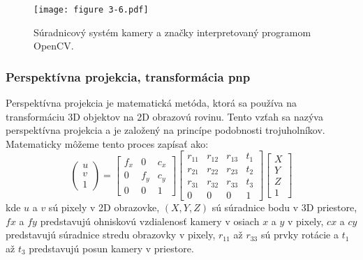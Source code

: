 {\begin{figure}[ht!]
    \centering
    \texttt{[image: figure 3-6.pdf]}
    \caption{Súradnicový systém kamery a značky interpretovaný programom OpenCV.}
    \label{o:3-6}
\end{figure}  

\subsubsection{Perspektívna projekcia, transformácia pnp}
Perspektívna projekcia je matematická metóda, ktorá sa používa na transformáciu 3D objektov na 2D obrazovú rovinu. Tento vzťah sa nazýva perspektívna projekcia a je založený na princípe podobnosti trojuholníkov. Matematicky môžeme tento proces zapísať ako:
\begin{equation}
    \begin{pmatrix} u \\ v \\ 1 \end{pmatrix} =
    \begin{bmatrix}
        f_x & 0 & c_x \\
        0 & f_y & c_y \\
        0 & 0 & 1
    \end{bmatrix}
    \begin{bmatrix}
        r_{11} & r_{12} & r_{13} & t_1 \\
        r_{21} & r_{22} & r_{23} & t_2 \\
        r_{31} & r_{32} & r_{33} & t_3 \\
        0 & 0 & 0 & 1
    \end{bmatrix}
    \begin{bmatrix}
        X \\ 
        Y \\
        Z \\
        1
    \end{bmatrix}
\end{equation}
kde $u$ a $v$ sú pixely v 2D obrazovke, $(X, Y, Z)$ sú súradnice bodu v 3D priestore, $fx$ a $fy$ predstavujú ohniskovú vzdialenosť kamery v osiach $x$ a $y$ v pixely, $cx$ a $cy$ predstavujú súradnice stredu obrazovky v pixely, $r_{11}$ až $r_{33}$ sú prvky rotácie a $t_1$ až $t_3$ predstavujú posun kamery v priestore.

}
